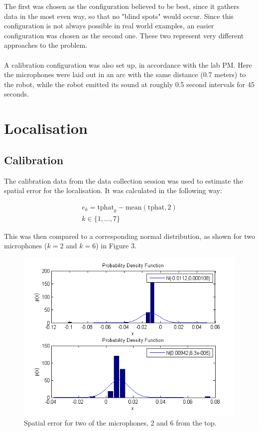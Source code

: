 \documentclass[11pt]{article}
\begin{document}
\newpage
The first was chosen as the configuration believed to be best, since it gathers data in the most even way, so that no "blind spots" would occur. Since this configuration is not always possible in real world examples, an easier configuration was chosen as the second one. These two represent very different approaches to the problem.\\\\
A calibration configuration was also set up, in accordance with the lab PM. Here the microphones were laid out in an arc with the same distance (0.7 meters) to the robot, while the robot emitted its sound at roughly 0.5 second intervals for 45 seconds.
\section{Localisation}
\subsection{Calibration}
The calibration data from the data collection session was used to estimate the spatial error for the localisation. It was calculated in the following way:

\begin{align*}
e_k = \text{tphat}_k-\text{mean}(\text{tphat}, 2)\\
k \in \{1,...,7\}
\end{align*}

This was then compared to a corresponding normal distribution, as shown for two microphones ($k=2$ and $k=6$) in Figure 3. 

\begin{figure}
\begin{center}
  \includegraphics[width=\textwidth]{calibration_ndist_2_and_6.png}
  \caption{Spatial error for two of the microphones, 2 and 6 from the top.}
  \end{center}
\end{figure}
\end{document}
